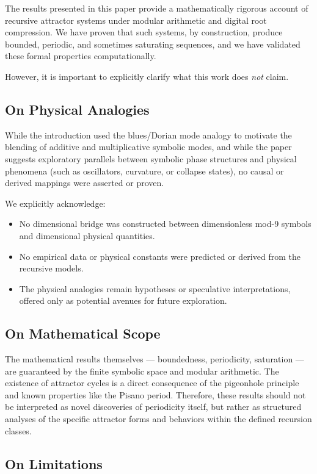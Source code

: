 \documentclass[12pt]{article}
\begin{document}
The results presented in this paper provide a mathematically rigorous account of recursive attractor systems under modular arithmetic and digital root compression. We have proven that such systems, by construction, produce bounded, periodic, and sometimes saturating sequences, and we have validated these formal properties computationally.

However, it is important to explicitly clarify what this work does \emph{not} claim.

\subsection{On Physical Analogies}

While the introduction used the blues/Dorian mode analogy to motivate the blending of additive and multiplicative symbolic modes, and while the paper suggests exploratory parallels between symbolic phase structures and physical phenomena (such as oscillators, curvature, or collapse states), no causal or derived mappings were asserted or proven.

We explicitly acknowledge:
\begin{itemize}
    \item No dimensional bridge was constructed between dimensionless mod-9 symbols and dimensional physical quantities.
    \item No empirical data or physical constants were predicted or derived from the recursive models.
    \item The physical analogies remain hypotheses or speculative interpretations, offered only as potential avenues for future exploration.
\end{itemize}

\subsection{On Mathematical Scope}

The mathematical results themselves — boundedness, periodicity, saturation — are guaranteed by the finite symbolic space and modular arithmetic. The existence of attractor cycles is a direct consequence of the pigeonhole principle and known properties like the Pisano period. Therefore, these results should not be interpreted as novel discoveries of periodicity itself, but rather as structured analyses of the specific attractor forms and behaviors within the defined recursion classes.

\subsection{On Limitations}
\end{document}
